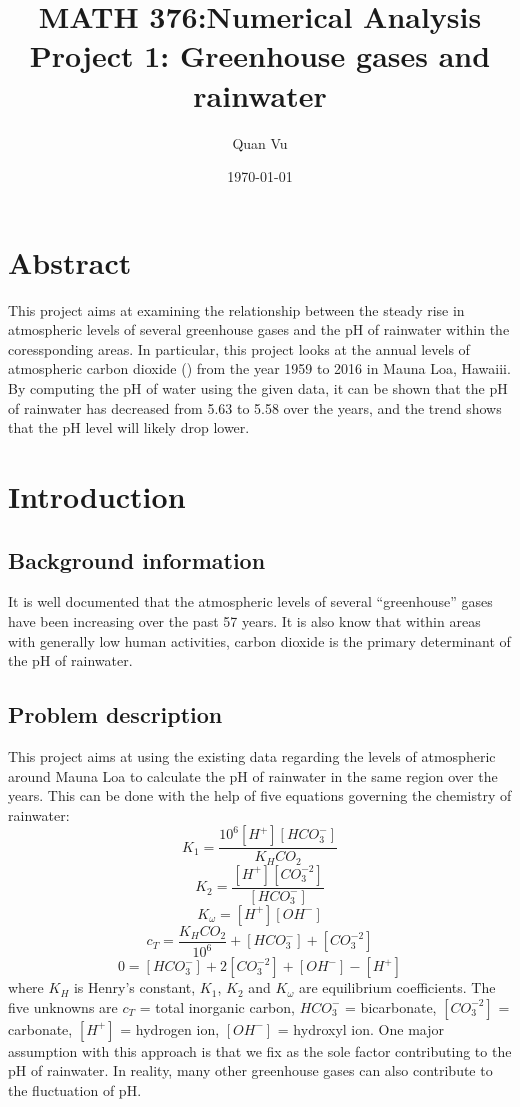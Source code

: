 \documentclass{article}
\title{%
	MATH 376:Numerical Analysis \\
	\large  Project 1: Greenhouse gases and rainwater
	}
\author{Quan Vu}
\date{\today}
\begin{document}
	\maketitle
	
	\section{Abstract}
	This project aims at examining the relationship between the steady 	rise in atmospheric levels of several greenhouse gases and the pH of rainwater within the coressponding areas. In particular, this project looks at the annual levels of atmospheric carbon dioxide () from the year 1959 to 2016 in Mauna Loa, Hawaiii. By computing the pH of water using the given data, it can be shown that the pH of rainwater has decreased from 5.63 to 5.58 over the years, and the trend shows that the pH level will likely drop lower.
	
	\section{Introduction}
	
	\subsection{Background information}
	It is well documented that the atmospheric levels of several “greenhouse” gases have been increasing over the past 57 years. It is also know that within areas with generally low human activities, carbon dioxide is the primary determinant of the pH of rainwater.
	
	\subsection{Problem description}
	This project aims at using the existing data regarding the levels of atmospheric  around Mauna Loa to calculate the pH of rainwater in the same region over the years. This can be done with the help of five equations governing the chemistry of rainwater:
	\[ K_1 = \frac{10^6[H^+][HCO_3^-]}{K_HCO_2} \tag{1} \]
	\[ K_2 = \frac{[H^+][CO_3^{-2}]}{[HCO_3^-]} \tag{2} \]
	\[ K_\omega = [H^+][OH^-] \tag{3} \]
	\[ c_T = \frac{K_HCO_2}{10^6} + [HCO_3^-] + [CO_3^{-2}] \tag{4} \]
	\[ 0 = [HCO_3^-] + 2[CO_3^{-2}] + [OH^-] - [H^+] \tag{5} \]
	where ${K_H}$ is Henry's constant, ${K_1}$, ${K_2}$ and ${K_\omega}$ are equilibrium coefficients. The five unknowns are ${c_T}$ = total inorganic carbon, ${HCO_3^-}$ = bicarbonate, ${[CO_3^{-2}]}$ = carbonate, ${[H^+]}$ = hydrogen ion, ${[OH^-]}$ = hydroxyl ion.
	One major assumption with this approach is that we fix  as the sole factor contributing to the pH of rainwater. In reality, many other greenhouse gases can also contribute to the fluctuation of pH.
\end{document}
